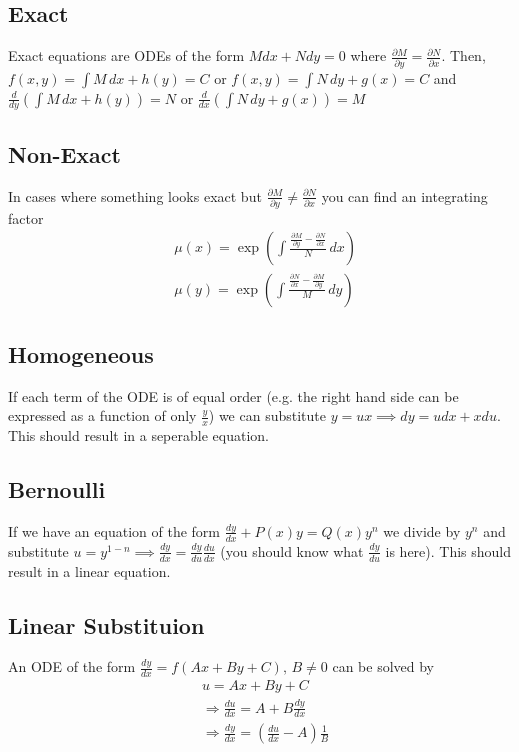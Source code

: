 \documentclass[10pt,landscape,letterpaper]{cheatsheet}
\begin{document}
\subsection*{Exact}
Exact equations are ODEs of the form $Mdx+Ndy=0$ where $\frac{\partial M}{\partial y}=\frac{\partial N}{\partial x}$. Then, $f(x,y)=\int M\,dx+h(y)=C$ or $f(x,y)=\int N\,dy+g(x)=C$
and $\frac{d}{dy}\left(\int M\,dx+h(y)\right)=N$ or $\frac{d}{dx}\left(\int N\,dy+g(x)\right)=M$
\subsection*{Non-Exact}
In cases where something looks exact but $\frac{\partial M}{\partial y}\neq\frac{\partial N}{\partial x}$ you can find an integrating factor 
\begin{align*}
         & \mu(x)=\exp\left(\int \frac{\frac{\partial M}{\partial y}-\frac{\partial N}{\partial x}}{N}\,dx\right) \\
         & \mu(y)=\exp\left(\int \frac{\frac{\partial N}{\partial x}-\frac{\partial M}{\partial y}}{M}\,dy\right)
\end{align*}
\subsection*{Homogeneous}
If each term of the ODE is of equal order (e.g. the right hand side can be expressed as a function of only $\frac{y}{x}$) we can substitute 
$y=ux\implies dy=udx+xdu$. This should result in a seperable equation.
\subsection*{Bernoulli}
If we have an equation of the form $\frac{dy}{dx}+P(x)y=Q(x)y^n$ we divide by $y^n$ and substitute $u=y^{1-n}\implies \frac{dy}{dx}=\frac{dy}{du}\frac{du}{dx}$ (you should know what $\frac{dy}{du}$ is here). This should result in a linear equation.
\subsection*{Linear Substituion}
An ODE of the form $\frac{dy}{dx}=f(Ax+By+C), \, B\neq 0$ can be solved by
\begin{align*}
         & u = Ax+By+C                                            \\
         & \Rightarrow \frac{du}{dx}=A+B\frac{dy}{dx}             \\
         & \Rightarrow \frac{dy}{dx}=(\frac{du}{dx}-A)\frac{1}{B} \\
\end{align*}
\end{document}
